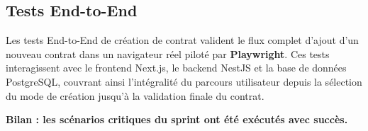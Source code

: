 \subsection{Tests End-to-End}
\label{sec:tests_e2e_contract}

Les tests End-to-End de création de contrat valident le flux complet
d'ajout d'un nouveau contrat dans un navigateur réel piloté par
\textbf{Playwright}. Ces tests interagissent avec le frontend Next.js,
le backend NestJS et la base de données PostgreSQL, couvrant ainsi
l'intégralité du parcours utilisateur depuis la sélection du mode de
création jusqu'à la validation finale du contrat.
\newline

\noindent\textbf{Bilan : les scénarios critiques du sprint ont été exécutés avec succès.}
\vspace{6pt}

